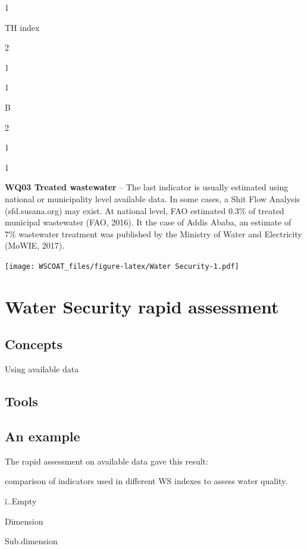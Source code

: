 \documentclass[
]{book}
\begin{document}
1

TH index

2

1

1

B

2

1

1

\hfill\break

\textbf{WQ03 Treated wastewater} -- The last indicator is usually estimated using national or municipality level available data. In some cases, a Shit Flow Analysis (sfd.susana.org) may exist. At national level, FAO estimated 0.3\% of treated municipal wastewater (FAO, 2016). It the case of Addis Ababa, an estimate of 7\% wastewater treatment was published by the Ministry of Water and Electricity (MoWIE, 2017).

\texttt{[image: WSCOAT\_files/figure-latex/Water Security-1.pdf]}

\hypertarget{water-security-rapid-assessment}{%
\chapter{Water Security rapid assessment}\label{water-security-rapid-assessment}}

\hypertarget{concepts-2}{%
\section{Concepts}\label{concepts-2}}

Using available data

\hypertarget{tools-2}{%
\section{Tools}\label{tools-2}}

\hypertarget{an-example-1}{%
\section{An example}\label{an-example-1}}

The rapid assessment on available data gave this result:

\label{tab:unnamed-chunk-7}comparison of indicators used in different WS indexes to assess water quality.

ï..Empty

Dimension

Sub.dimension
\end{document}
